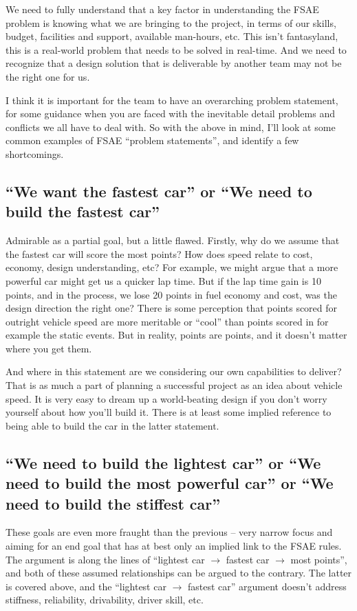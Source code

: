 \documentclass[10pt, a4paper, article, oneside, twocolumn, final]{memoir}
\begin{document}
We need to fully understand that a key factor in understanding the FSAE problem is knowing what we are bringing to the project, in terms of our skills, budget, facilities and support, available man-hours, etc. This isn't fantasyland, this is a real-world problem that needs to be solved in real-time. And we need to recognize that a design solution that is deliverable by another team may not be the right one for us. 

I think it is important for the team to have an overarching problem statement, for some guidance when you are faced with the inevitable detail problems and conflicts we all have to deal with. So with the above in mind, I'll look at some common examples of FSAE “problem statements”, and identify a few shortcomings. 

\subsection*{“We want the fastest car” or “We need to build the fastest car”}
Admirable as a partial goal, but a little flawed. Firstly, why do we assume that the fastest car will score the most points? How does speed relate to cost, economy, design understanding, etc? For example, we might argue that a more powerful car might get us a quicker lap time. But if the lap time gain is \num{10} points, and in the process, we lose \num{20} points in fuel economy and cost, was the design direction the right one? There is some perception that points scored for outright vehicle speed are more meritable or “cool” than points scored in for example the static events. But in reality, points are points, and it doesn't matter where you get them. 

And where in this statement are we considering our own capabilities to deliver? That is as much a part of planning a successful project as an idea about vehicle speed. It is very easy to dream up a world-beating design if you don't worry yourself about how you'll build it. There is at least some implied reference to being able to build the car in the latter statement. 

\subsection*{“We need to build the lightest car” or “We need to build the most powerful car” or “We need to build the stiffest car”}
These goals are even more fraught than the previous -- very narrow focus and aiming for an end goal that has at best only an implied link to the FSAE rules. The argument is along the lines of “lightest car $\rightarrow$ fastest car $\rightarrow$ most points”, and both of these assumed relationships can be argued to the contrary. The latter is covered above, and the “lightest car $\rightarrow$ fastest car” argument doesn't address stiffness, reliability, drivability, driver skill, etc. 
\end{document}
